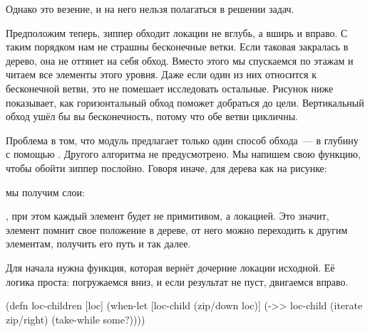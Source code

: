 \begin{figure}[H]
  \centering
  
  \label{fig:chart-zip-20}
\end{figure}

Однако это везение, и на него нельзя полагаться в решении задач.

Предположим теперь, зиппер обходит локации не вглубь, а вширь и вправо. С таким
порядком нам не страшны бесконечные ветки. Если таковая закралась в дерево, она
не оттянет на себя обход. Вместо этого мы спускаемся по этажам и читаем все
элементы этого уровня. Даже если один из них относится к бесконечной ветви, это
не помешает исследовать остальные. Рисунок ниже показывает, как горизонтальный
обход поможет добраться до цели. Вертикальный обход ушёл бы вы бесконечность,
потому что обе ветви цикличны.

\begin{figure}[H]
  \centering
  
  \label{fig:chart-zip-21}
\end{figure}

Проблема в том, что модуль  предлагает только один способ
обхода~--- в глубину с помощью . Другого алгоритма не
предусмотрено. Мы напишем свою функцию, чтобы обойти зиппер послойно. Говоря
иначе, для дерева как на рисунке:

\begin{figure}[H]
  \centering
  
  \label{fig:chart-zip-22}
\end{figure}

\noindent
мы получим слои:

\begin{english}
  \begin{clojure}
[a]
[b c]
[d e f g]
  \end{clojure}
\end{english}

\noindent
, при этом каждый элемент будет не примитивом, а локацией. Это значит, элемент
помнит свое положение в дереве, от него можно переходить к другим элементам,
получить его путь и так далее.

Для начала нужна функция, которая вернёт дочерние локации исходной. Её логика
проста: погружаемся вниз, и если результат не пуст, двигаемся вправо.

\begin{english}
  \begin{clojure}
(defn loc-children [loc]
  (when-let [loc-child (zip/down loc)]
    (->> loc-child
         (iterate zip/right)
         (take-while some?))))
  \end{clojure}
\end{english}

